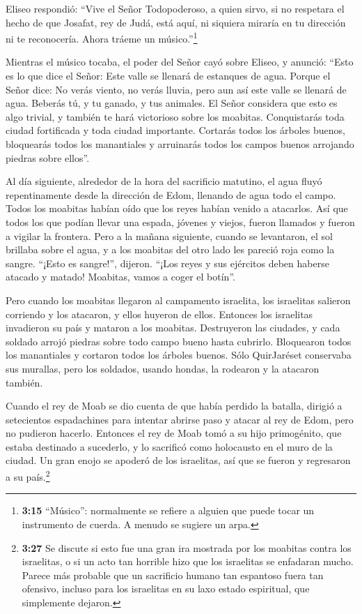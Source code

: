  Eliseo respondió: ``Vive el Señor Todopoderoso, a quien
sirvo, si no respetara el hecho de que Josafat, rey de Judá, está aquí,
ni siquiera miraría en tu dirección ni te reconocería. 
Ahora tráeme un músico.''\footnote{\textbf{3:15} ``Músico'': normalmente
  se refiere a alguien que puede tocar un instrumento de cuerda. A
  menudo se sugiere un arpa.}

Mientras el músico tocaba, el poder del Señor cayó sobre Eliseo,
 y anunció: ``Esto es lo que dice el Señor: Este valle se
llenará de estanques de agua. Porque el Señor dice:  No
verás viento, no verás lluvia, pero aun así este valle se llenará de
agua. Beberás tú, y tu ganado, y tus animales.  El Señor
considera que esto es algo trivial, y también te hará victorioso sobre
los moabitas.  Conquistarás toda ciudad fortificada y toda
ciudad importante. Cortarás todos los árboles buenos, bloquearás todos
los manantiales y arruinarás todos los campos buenos arrojando piedras
sobre ellos''.

 Al día siguiente, alrededor de la hora del sacrificio
matutino, el agua fluyó repentinamente desde la dirección de Edom,
llenando de agua todo el campo.  Todos los moabitas habían
oído que los reyes habían venido a atacarlos. Así que todos los que
podían llevar una espada, jóvenes y viejos, fueron llamados y fueron a
vigilar la frontera.  Pero a la mañana siguiente, cuando se
levantaron, el sol brillaba sobre el agua, y a los moabitas del otro
lado les pareció roja como la sangre.  ``¡Esto es
sangre!'', dijeron. ``¡Los reyes y sus ejércitos deben haberse atacado y
matado! Moabitas, vamos a coger el botín''.

 Pero cuando los moabitas llegaron al campamento israelita,
los israelitas salieron corriendo y los atacaron, y ellos huyeron de
ellos. Entonces los israelitas invadieron su país y mataron a los
moabitas.  Destruyeron las ciudades, y cada soldado arrojó
piedras sobre todo campo bueno hasta cubrirlo. Bloquearon todos los
manantiales y cortaron todos los árboles buenos. Sólo QuirJaréset
conservaba sus murallas, pero los soldados, usando hondas, la rodearon y
la atacaron también.

 Cuando el rey de Moab se dio cuenta de que había perdido
la batalla, dirigió a setecientos espadachines para intentar abrirse
paso y atacar al rey de Edom, pero no pudieron hacerlo. 
Entonces el rey de Moab tomó a su hijo primogénito, que estaba destinado
a sucederlo, y lo sacrificó como holocausto en el muro de la ciudad. Un
gran enojo se apoderó de los israelitas, así que se fueron y regresaron
a su país.\footnote{\textbf{3:27} Se discute si esto fue una gran ira
  mostrada por los moabitas contra los israelitas, o si un acto tan
  horrible hizo que los israelitas se enfadaran mucho. Parece más
  probable que un sacrificio humano tan espantoso fuera tan ofensivo,
  incluso para los israelitas en su laxo estado espiritual, que
  simplemente dejaron.}

